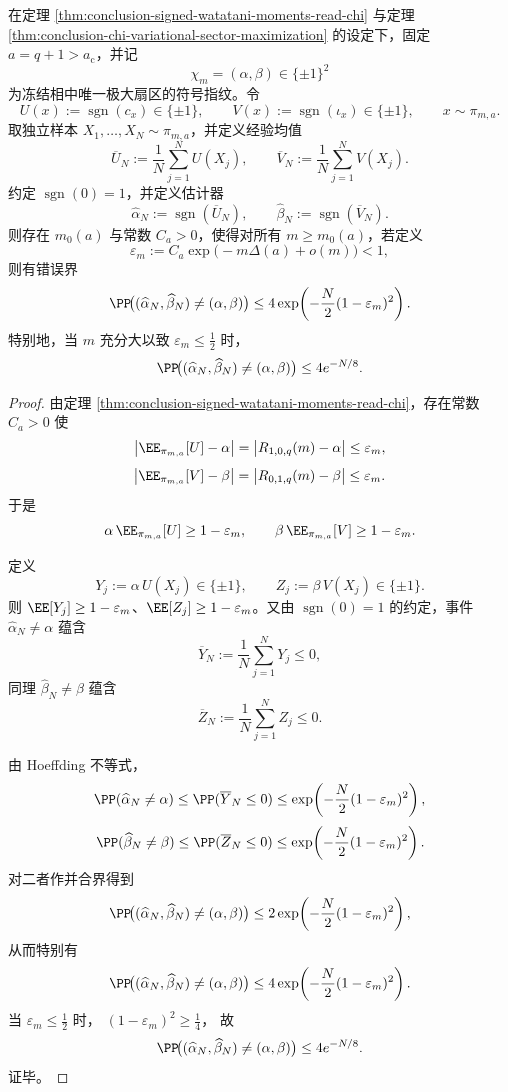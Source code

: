 \begin{theorem}\label{thm:conclusion-window6-sheet-parity-sampling-law}
在定理 \ref{thm:conclusion-signed-watatani-moments-read-chi} 与定理 \ref{thm:conclusion-chi-variational-sector-maximization} 的设定下，固定 \(a=q+1>a_{\mathrm c}\)，并记
\[
\chi_m=(\alpha,\beta)\in\{\pm1\}^2
\]
为冻结相中唯一极大扇区的符号指纹。令
\[
U(x):=\operatorname{sgn}(c_x)\in\{\pm1\},
\qquad
V(x):=\operatorname{sgn}(\iota_x)\in\{\pm1\},
\qquad
x\sim \pi_{m,a}.
\]
取独立样本 \(X_1,\dots,X_N\sim \pi_{m,a}\)，并定义经验均值
\[
\overline U_N:=\frac1N\sum_{j=1}^{N}U(X_j),
\qquad
\overline V_N:=\frac1N\sum_{j=1}^{N}V(X_j).
\]
约定 \(\operatorname{sgn}(0)=1\)，并定义估计器
\[
\widehat\alpha_N:=\operatorname{sgn}(\overline U_N),
\qquad
\widehat\beta_N:=\operatorname{sgn}(\overline V_N).
\]
则存在 \(m_0(a)\) 与常数 \(C_a>0\)，使得对所有 \(m\ge m_0(a)\)，若定义
\[
\varepsilon_m:=C_a\exp\!\bigl(-m\Delta(a)+o(m)\bigr)<1,
\]
则有错误界
\[
\PP\!\bigl((\widehat\alpha_N,\widehat\beta_N)\neq(\alpha,\beta)\bigr)
\le
4\exp\!\left(-\frac{N}{2}(1-\varepsilon_m)^2\right).
\]
特别地，当 \(m\) 充分大以致 \(\varepsilon_m\le \frac12\) 时，
\[
\PP\!\bigl((\widehat\alpha_N,\widehat\beta_N)\neq(\alpha,\beta)\bigr)
\le 4e^{-N/8}.
\]
\end{theorem}
\begin{proof}
由定理 \ref{thm:conclusion-signed-watatani-moments-read-chi}，存在常数 \(C_a>0\) 使
\[
\bigl|\EE_{\pi_{m,a}}[U]-\alpha\bigr|
=
\bigl|R_{1,0,q}(m)-\alpha\bigr|
\le
\varepsilon_m,
\]
\[
\bigl|\EE_{\pi_{m,a}}[V]-\beta\bigr|
=
\bigl|R_{0,1,q}(m)-\beta\bigr|
\le
\varepsilon_m.
\]
于是
\[
\alpha\,\EE_{\pi_{m,a}}[U]\ge 1-\varepsilon_m,
\qquad
\beta\,\EE_{\pi_{m,a}}[V]\ge 1-\varepsilon_m.
\]

定义
\[
Y_j:=\alpha\,U(X_j)\in\{\pm1\},
\qquad
Z_j:=\beta\,V(X_j)\in\{\pm1\}.
\]
则 \(\EE[Y_j]\ge 1-\varepsilon_m\)、\(\EE[Z_j]\ge 1-\varepsilon_m\)。又由 \(\operatorname{sgn}(0)=1\) 的约定，事件 \(\widehat\alpha_N\neq \alpha\) 蕴含
\[
\overline Y_N:=\frac1N\sum_{j=1}^{N}Y_j\le 0,
\]
同理 \(\widehat\beta_N\neq \beta\) 蕴含
\[
\overline Z_N:=\frac1N\sum_{j=1}^{N}Z_j\le 0.
\]

由 Hoeffding 不等式，
\[
\PP(\widehat\alpha_N\neq \alpha)
\le
\PP(\overline Y_N\le 0)
\le
\exp\!\left(-\frac{N}{2}(1-\varepsilon_m)^2\right),
\]
\[
\PP(\widehat\beta_N\neq \beta)
\le
\PP(\overline Z_N\le 0)
\le
\exp\!\left(-\frac{N}{2}(1-\varepsilon_m)^2\right).
\]
对二者作并合界得到
\[
\PP\!\bigl((\widehat\alpha_N,\widehat\beta_N)\neq(\alpha,\beta)\bigr)
\le
2\exp\!\left(-\frac{N}{2}(1-\varepsilon_m)^2\right),
\]
从而特别有
\[
\PP\!\bigl((\widehat\alpha_N,\widehat\beta_N)\neq(\alpha,\beta)\bigr)
\le
4\exp\!\left(-\frac{N}{2}(1-\varepsilon_m)^2\right).
\]
当 \(\varepsilon_m\le \frac12\) 时，
\(
(1-\varepsilon_m)^2\ge \frac14
\)，
故
\[
\PP\!\bigl((\widehat\alpha_N,\widehat\beta_N)\neq(\alpha,\beta)\bigr)
\le
4e^{-N/8}.
\]
证毕。
\end{proof}

